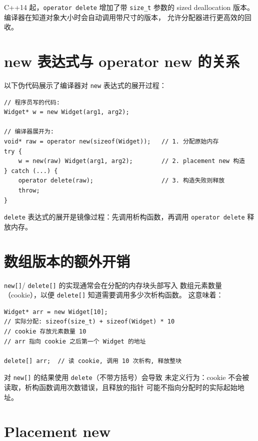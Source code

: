 \documentclass[12pt,a4paper,fontset=fandol]{ctexbook}
\newcommand{\cpp}[1]{C++#1}
\begin{document}
\begin{note}
\cpp{14} 起，\texttt{operator delete} 增加了带 \texttt{size\_t} 参数的
sized deallocation 版本。编译器在知道对象大小时会自动调用带尺寸的版本，
允许分配器进行更高效的回收。
\end{note}

\section{new 表达式与 operator new 的关系}

以下伪代码展示了编译器对 \texttt{new} 表达式的展开过程：

\begin{lstlisting}
// 程序员写的代码:
Widget* w = new Widget(arg1, arg2);

// 编译器展开为:
void* raw = operator new(sizeof(Widget));   // 1. 分配原始内存
try {
    w = new(raw) Widget(arg1, arg2);        // 2. placement new 构造
} catch (...) {
    operator delete(raw);                   // 3. 构造失败则释放
    throw;
}
\end{lstlisting}

\texttt{delete} 表达式的展开是镜像过程：先调用析构函数，再调用
\texttt{operator delete} 释放内存。

\section{数组版本的额外开销}

\texttt{new[]}/ \texttt{delete[]} 的实现通常会在分配的内存块头部写入
数组元素数量（cookie），以便 \texttt{delete[]} 知道需要调用多少次析构函数。
这意味着：

\begin{lstlisting}
Widget* arr = new Widget[10];
// 实际分配: sizeof(size_t) + sizeof(Widget) * 10
// cookie 存放元素数量 10
// arr 指向 cookie 之后第一个 Widget 的地址

delete[] arr;  // 读 cookie, 调用 10 次析构, 释放整块
\end{lstlisting}

\begin{warning}
对 \texttt{new[]} 的结果使用 \texttt{delete}（不带方括号）会导致
未定义行为：cookie 不会被读取，析构函数调用次数错误，且释放的指针
可能不指向分配时的实际起始地址。
\end{warning}

\section{Placement new}
\end{document}
